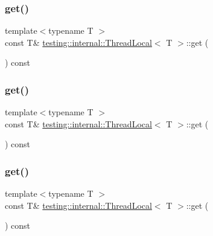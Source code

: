\subsubsection{\texorpdfstring{get()}{get()}\hspace{0.1cm}{\footnotesize\ttfamily [1/3]}}
{\footnotesize\ttfamily template$<$typename T $>$ \\
const T\& \mbox{\hyperlink{classtesting_1_1internal_1_1_thread_local}{testing\+::internal\+::\+Thread\+Local}}$<$ T $>$\+::get (\begin{DoxyParamCaption}{ }\end{DoxyParamCaption}) const\hspace{0.3cm}{\ttfamily [inline]}}

\mbox{\label{classtesting_1_1internal_1_1_thread_local_ac56aeb97991824979bf192c63d1466f8}} 
\subsubsection{\texorpdfstring{get()}{get()}\hspace{0.1cm}{\footnotesize\ttfamily [2/3]}}
{\footnotesize\ttfamily template$<$typename T $>$ \\
const T\& \mbox{\hyperlink{classtesting_1_1internal_1_1_thread_local}{testing\+::internal\+::\+Thread\+Local}}$<$ T $>$\+::get (\begin{DoxyParamCaption}{ }\end{DoxyParamCaption}) const\hspace{0.3cm}{\ttfamily [inline]}}

\mbox{\label{classtesting_1_1internal_1_1_thread_local_ac56aeb97991824979bf192c63d1466f8}} 
\subsubsection{\texorpdfstring{get()}{get()}\hspace{0.1cm}{\footnotesize\ttfamily [3/3]}}
{\footnotesize\ttfamily template$<$typename T $>$ \\
const T\& \mbox{\hyperlink{classtesting_1_1internal_1_1_thread_local}{testing\+::internal\+::\+Thread\+Local}}$<$ T $>$\+::get (\begin{DoxyParamCaption}{ }\end{DoxyParamCaption}) const\hspace{0.3cm}{\ttfamily [inline]}}

